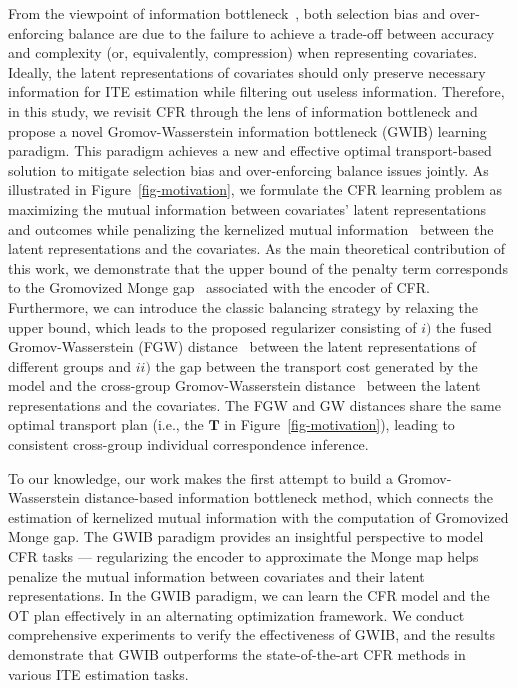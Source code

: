 \documentclass{article}
\begin{document}
From the viewpoint of information bottleneck~\cite{tishby1999information}, both selection bias and over-enforcing balance are due to the failure to achieve a trade-off between accuracy and complexity (or, equivalently, compression) when representing covariates.
Ideally, the latent representations of covariates should only preserve necessary information for ITE estimation while filtering out useless information.
Therefore, in this study, we revisit CFR through the lens of information bottleneck and propose a novel Gromov-Wasserstein information bottleneck (GWIB) learning paradigm. 
This paradigm achieves a new and effective optimal transport-based solution to mitigate selection bias and over-enforcing balance issues jointly. 
As illustrated in Figure~\ref{fig-motivation}, we formulate the CFR learning problem as maximizing the mutual information between covariates' latent representations and outcomes while penalizing the kernelized mutual information~\cite{chuang2023infoot} between the latent representations and the covariates. 
As the main theoretical contribution of this work, we demonstrate that the upper bound of the penalty term corresponds to the Gromovized Monge gap~\cite{uscidda2023monge} associated with the encoder of CFR.
Furthermore, we can introduce the classic balancing strategy by relaxing the upper bound, which leads to the proposed regularizer consisting of $i)$ the fused Gromov-Wasserstein (FGW) distance~\cite{titouan2019optimal} between the latent representations of different groups and $ii)$ the gap between the transport cost generated by the model and the cross-group Gromov-Wasserstein distance~\cite{memoli2011gromov} between the latent representations and the covariates.
The FGW and GW distances share the same optimal transport plan (i.e., the $\bm{T}$ in Figure~\ref{fig-motivation}), leading to consistent cross-group individual correspondence inference. 

To our knowledge, our work makes the first attempt to build a Gromov-Wasserstein distance-based information bottleneck method, which connects the estimation of kernelized mutual information with the computation of Gromovized Monge gap.
The GWIB paradigm provides an insightful perspective to model CFR tasks --- regularizing the encoder to approximate the Monge map helps penalize the mutual information between covariates and their latent representations. 
In the GWIB paradigm, we can learn the CFR model and the OT plan effectively in an alternating optimization framework.
We conduct comprehensive experiments to verify the effectiveness of GWIB, and the results demonstrate that GWIB outperforms the state-of-the-art CFR methods in various ITE estimation tasks. 
\end{document}
